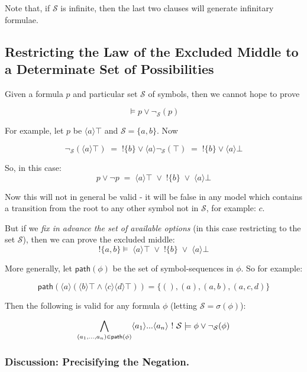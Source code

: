 \NI Note that, if $\mathcal{S}$ is infinite, then the last two clauses will generate infinitary formulae.

\subsection{Restricting the Law of the Excluded Middle to a Determinate Set of Possibilities}

Given a formula $p$ and particular set $\mathcal{S}$ of symbols, then we
cannot hope to prove

\[
\models p \lor \neg_\mathcal{S}(p)
\]

\NI For example, let $p$ be $\langle a \rangle \top$ and $\mathcal{S} = \{a,
b\}$.  Now

\[
\neg_\mathcal{S}(\langle a \rangle \top) \; = \; ! \{b\} \lor \langle a \rangle \neg_\mathcal{S}(\top) \; =  \; ! \{b\} \lor \langle a \rangle \bot
\]

\NI So, in this case:
\[
p \lor \neg p \; = \; \langle a \rangle \top \; \lor \; ! \{b\} \; \lor \; \langle a \rangle \bot
\]

\NI Now this will not in general be valid - it will be false in any model
which contains a transition from the root to any other symbol not in
$\mathcal{S}$, for example: $c$.

But if we \emph{fix in advance the set of available options} (in this
case restricting to the set $\mathcal{S}$), then we can prove the excluded
middle:
\[
!\{a, b\} \models \; \langle a \rangle \top \; \lor \; ! \{b\} \; \lor \; \langle a \rangle \bot
\]

\NI More generally, let $\mathsf{path}(\phi)$ be the set of
symbol-sequences in $\phi$.  So for example:

\[
\mathsf{path}(\langle a \rangle (\langle b \rangle \top \land \langle c \rangle \langle d \rangle \top)) = \{(), (a), (a, b), (a, c, d)\}
\]

\NI Then the following is valid for any formula $\phi$ (letting
$\mathcal{S} = \sigma(\phi)$):

\[
\bigwedge_{(a_1, ..., a_n) \in \mathsf{path}(\phi)} \langle a_1 \rangle ... \langle a_n \rangle \ ! \  \mathcal{S} \models \phi \lor \neg_\mathcal{S} (\phi)
\]

\subsubsection{Discussion: Precisifying the Negation. }


